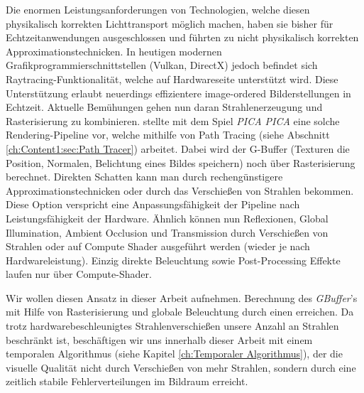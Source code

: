 Die enormen Leistungsanforderungen von Technologien, welche diesen physikalisch korrekten Lichttransport möglich machen, haben sie bisher für Echtzeitanwendungen ausgeschlossen 
und führten zu nicht physikalisch korrekten Approximationstechnicken.
In heutigen modernen Grafikprogrammierschnittstellen (Vulkan, DirectX) jedoch befindet sich Raytracing-Funktionalität, welche auf Hardwareseite unterstützt wird.
Diese Unterstützung erlaubt neuerdings effizientere image-ordered Bilderstellungen in Echtzeit.  
Aktuelle Bemühungen gehen nun daran Strahlenerzeugung und Rasterisierung zu kombinieren. \cite{Barre-Brisebois2019} stellte
mit dem Spiel \textit{PICA PICA} eine solche Rendering-Pipeline vor, welche mithilfe von Path Tracing
(siehe Abschnitt \ref{ch:Content1:sec:Path Tracer}) arbeitet. Dabei wird der G-Buffer
(Texturen die Position, Normalen, Belichtung eines Bildes speichern) noch über Rasterisierung berechnet. Direkten Schatten kann man durch
rechengünstigere Approximationstechnicken oder durch das Verschießen von Strahlen bekommen. Diese Option verspricht eine Anpassungsfähigkeit der Pipeline nach Leistungsfähigkeit der Hardware. Ähnlich können nun
Reflexionen, Global Illumination, Ambient Occlusion und Transmission durch Verschießen von Strahlen oder auf Compute Shader ausgeführt werden (wieder je nach 
Hardwareleistung). Einzig direkte Beleuchtung sowie Post-Processing Effekte laufen nur über Compute-Shader. \par

Wir wollen diesen Ansatz in dieser Arbeit aufnehmen. Berechnung des \textit{GBuffer}'s mit Hilfe von Rasterisierung und globale Beleuchtung durch 
einen  erreichen. Da trotz hardwarebeschleunigtes Strahlenverschießen unsere Anzahl an Strahlen beschränkt ist, 
beschäftigen wir uns innerhalb dieser Arbeit mit einem temporalen Algorithmus (siehe Kapitel \ref{ch:Temporaler Algorithmus}), der die visuelle Qualität nicht 
durch Verschießen von mehr Strahlen, sondern durch eine zeitlich stabile  Fehlerverteilungen im Bildraum erreicht.